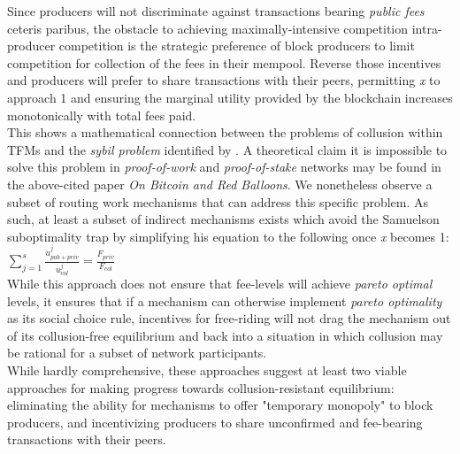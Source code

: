 \documentclass[11pt,a4paper]{llncs}
\begin{document}
Since producers will not discriminate against transactions bearing \textit{public fees} ceteris paribus, the obstacle to achieving maximally-intensive competition intra-producer competition is the strategic preference of block producers to limit competition for collection of the fees in their mempool. Reverse those incentives and producers will prefer to share transactions with their peers, permitting \textit{x} to approach 1 and ensuring the marginal utility provided by the blockchain increases monotonically with total fees paid.
\vspace{0.2cm} \\
This shows a mathematical connection between the problems of collusion within TFMs and the \textit{sybil problem} identified by \cite{babaioffredballoons}. A theoretical claim it is impossible to solve this problem in \textit{proof-of-work} and \textit{proof-of-stake} networks may be found in the above-cited paper \textit{On Bitcoin and Red Balloons}. We nonetheless observe a subset of routing work mechanisms that can address this specific problem. As such, at least a subset of indirect mechanisms exists which avoid the Samuelson suboptimality trap by simplifying his equation to the following once \textit{x} becomes 1:
\vspace{0.2cm} \\
\LARGE
\begin{math}
\sum_{j=1}^{s} \frac{u_{{pub}+{priv}}^j}{u_{col}^j} = \frac{F_{{priv}}}{F_{col}}
\end{math}
\normalsize
\vspace{0.2cm} \\
While this approach does not ensure that fee-levels will achieve \textit{pareto optimal} levels, it ensures that if a mechanism can otherwise implement \textit{pareto optimality} as its social choice rule, incentives for free-riding will not drag the mechanism out of its collusion-free equilibrium and back into a situation in which collusion may be rational for a subset of network participants.
\vspace{0.2cm} \\
While hardly comprehensive, these approaches suggest at least two viable approaches for making progress towards collusion-resistant equilibrium: eliminating the ability for mechanisms to offer "temporary monopoly" to block producers, and incentivizing producers to share unconfirmed and fee-bearing transactions with their peers.
\end{document}
